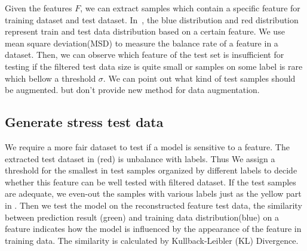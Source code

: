 Given the features $F$, we can extract samples which contain a specific 
feature for training dataset and test dataset. In~, the blue 
distribution and red distribution represent  train and test data distribution based on 
a certain feature. We use mean square deviation(MSD) to measure the balance rate 
of a feature in a dataset. Then, we can observe which feature of the test set 
is insufficient for testing if the filtered test data size is quite small or samples on 
some label is rare which bellow a threshold $\sigma$. 
We can point out what kind of test samples should be augmented. 
but don't provide new method for data augmentation. 


\subsection{Generate stress test data}
\label{sec:generate}

We require a more fair dataset to test if a model is sensitive to a feature.
The extracted test dataset in  (red) is unbalance with 
labels. Thus We assign a threshold for the smallest in test samples 
organized by different labels to decide whether this feature can be well tested 
with filtered dataset. If the test samples are adequate, we even-out the samples 
with various labels just as the yellow part in . Then we test the model 
on the reconstructed feature test data, the similarity between prediction result (green) and 
training data distribution(blue) on a feature indicates how the model is influenced by 
the appearance of the feature in training data. The similarity is 
calculated by Kullback-Leibler (KL) Divergence.

